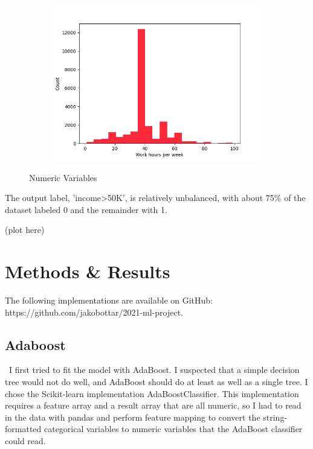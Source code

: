 \documentclass{article}
\begin{document}
\begin{figure}[H]
\begin{subfigure}{0.3\textwidth}
    \end{subfigure}
    \begin{subfigure}{0.3\textwidth}
        \includegraphics[width=\linewidth,]{img/hours-per-week.png}
    \end{subfigure}

    \caption{Numeric Variables}
    \label{fig:num_vars}
\end{figure}

The output label, 'income>50K', is relatively unbalanced, with about 75\% of the dataset labeled 0 and the remainder with 1. 

(plot here)

\section{Methods \& Results}

The following implementations are available on GitHub: https://github.com/jakobottar/2021-ml-project.

\subsection{Adaboost}
\
I first tried to fit the model with AdaBoost. I suspected that a simple decision tree would not do well, and AdaBoost should do at least as well as a single tree. I chose the Scikit-learn implementation AdaBoostClassifier. This implementation requires a feature array and a result array that are all numeric, so I had to read in the data with pandas and perform feature mapping to convert the string-formatted categorical variables to numeric variables that the AdaBoost classifier could read. 
\end{document}
